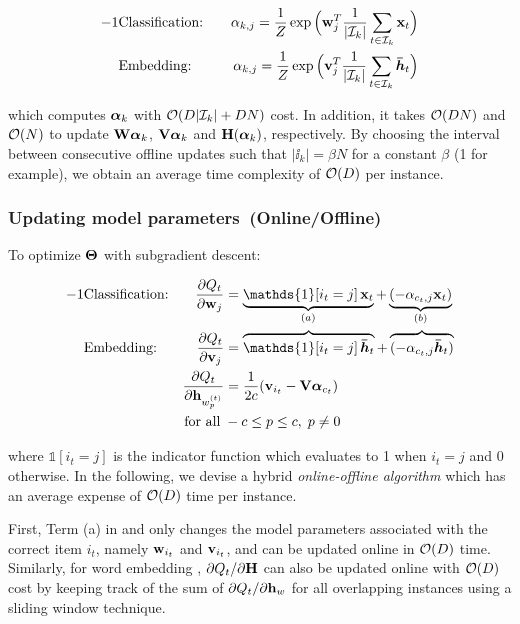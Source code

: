 \begin{alignat}{-1}
  &\cc & \quad
  \alpha_{k, j} = \frac{1}{Z} \exp\Big( \vw_j^T
  \frac{1}{| \ii_k |} \sum\limits_{t \in \ii_k} \vx_t\Big)
  \label{eq::up_clu_center_classification}\\
  &\ee &
  \alpha_{k, j} = \frac{1}{Z} \exp\Big( \vv_j^T
  \frac{1}{| \ii_k |} \sum\limits_{t \in \ii_k} \vhb_t\Big)
  \label{eq::up_clu_center_embedding}
\end{alignat}

which computes $\boldsymbol{\alpha}_k$ with $\mathcal{O}(D |\mathcal{I}_k|  + D N)$ cost. In addition, it
takes $\mathcal{O}(DN)$ and $\mathcal{O}(N)$ to update $\mathbf{W} \boldsymbol{\alpha}_{k}$, $\mathbf{V} \boldsymbol{\alpha}_{k}$ and
$\mathbf{H}(\boldsymbol{\alpha}_k)$, respectively. By choosing the interval between
consecutive offline updates such that $|\ii_k| = \beta N$ for a constant $\beta$
(1 for example), we obtain an average time complexity of $\mathcal{O}(D)$ per instance.

\subsubsection{Updating model parameters~(Online/Offline)}

To optimize $\mathbf{\Theta}$ with subgradient descent:

\begin{alignat}{-1}
  &\cc &
  \frac{\partial Q_t}{\partial \vw_j} &=
    \underbrace{\mathds{1}[i_t = j]\, \vx_t}_{(a)} +
    \underbrace{(-\alpha_{c_t, j} \vx_t)}_{(b)}
    \label{eq::mdl_upd_classification}\\
  &\ee &
  \frac{\partial Q_t}{\partial \vv_j} &=
    \overbrace{\mathds{1}[i_t = j]\, \vhb_t} +
    \overbrace{(-\alpha_{c_t, j} \vhb_t)}
    \label{eq::mdl_upd_embedding_v}\\
  &&
  \frac{\partial Q_t}{\partial \vh_{w_p^{(t)}}} &=
    \frac{1}{2c} (\vv_{i_t} - \vV \valpha_{c_t})
    \label{eq::mdl_upd_embedding_h}\\
  &&
  \textrm{for all}\; &-c \le p \le c,\; p \ne 0 \nonumber
\end{alignat}

where $\mathds{1}[i_t = j]$ is the indicator function which evaluates to 1 when
$i_t = j$ and 0 otherwise. In the following, we devise a hybrid
\emph{online-offline algorithm} which has an average expense of $\mathcal{O}(D)$ time
per instance.

First, Term (a) in  and
 only changes the model parameters associated with
the correct item $i_t$, namely $\mathbf{w}_{i_t}$ and $\mathbf{v}_{i_t}$, and can be updated
online in $\mathcal{O}(D)$ time. Similarly, for word embedding
, $\partial Q_t / \partial \mathbf{H}$ can also be
updated online with $\mathcal{O}(D)$ cost by keeping track of the sum of $\partial Q_t /
\partial \mathbf{h}_{w}$ for all overlapping instances using a sliding window
technique.

